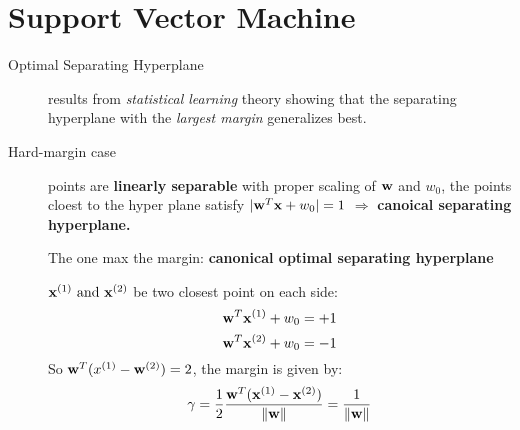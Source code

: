 \chapter{Support Vector Machine}
\begin{description}
    \item[Optimal Separating Hyperplane] results from \emph{statistical
        learning} theory showing that the separating hyperplane with the
        \emph{largest margin} generalizes best. 
    \item[Hard-margin case] points are \textbf{linearly separable}
             with proper scaling of $\mathbf{w}$ and $w_0$, the points cloest to
                the hyper plane satisfy $|\mathbf{w}^T\mathbf{x} + w_0|=1$ $\Rightarrow$ \textbf{canoical
                separating hyperplane.}

             The one max the margin: \textbf{canonical optimal separating
                hyperplane}

             $\mathbf{x}^{(1)}\mbox{ and }\mathbf{x}^{(2)}$ be two closest point on each
                side:
                \[ \mathbf{w}^T\mathbf{x}^{(1)} + w_0=+1\]
                \[\mathbf{w}^T\mathbf{x}^{(2)} + w_0 = -1\]
                So $\mathbf{w}^T(x^{(1)}-\mathbf{w}^{(2)}) = 2$, the margin is given by:
                \[\gamma = \frac{1}{2}
                    \frac{\mathbf{w}^T(\mathbf{x}^{(1)}-\mathbf{x}^{(2)})}{\|\mathbf{w}\|} =
                    \frac{1}{\|\mathbf{w}\|}\] 


\end{description}
